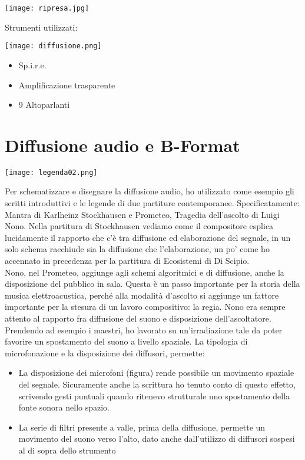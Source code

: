 \begin{center}
\texttt{[image: ripresa.jpg]}
\end{center}

Strumenti utilizzati:
\\
\begin{center}
\texttt{[image: diffusione.png]}
\end{center}
\begin{itemize}
	\item{Sp.i.r.e.}
	\item{Amplificazione trasparente}
	\item{9 Altoparlanti}
\end{itemize}


\section{Diffusione audio e B-Format}
\begin{center}
\texttt{[image: legenda02.png]}
\end{center}


Per schematizzare e disegnare la diffusione audio, ho utilizzato come esempio gli scritti introduttivi e le legende di due partiture contemporanee. Specificatamente: Mantra di Karlheinz Stockhausen e Prometeo, Tragedia dell'ascolto di Luigi Nono. Nella partitura di Stockhausen vediamo come il compositore esplica lucidamente il rapporto che c'è tra diffusione ed elaborazione del segnale, in un solo schema racchiude sia la diffusione che l'elaborazione, un po' come ho accennato in precedenza per la partitura di Ecosistemi di Di Scipio. \\
Nono, nel Prometeo, aggiunge agli schemi algoritmici e di diffusione, anche la disposizione del pubblico in sala. Questa è un passo importante per la storia della musica elettroacustica, perché alla modalità d'ascolto si aggiunge un fattore importante per la stesura di un lavoro compositivo: la regia. Nono era sempre attento al rapporto fra diffusione del suono e disposizione dell'ascoltatore. \\
Prendendo ad esempio i maestri, ho lavorato su un'irradiazione tale da poter favorire un spostamento del suono a livello spaziale. La tipologia di microfonazione e la disposizione dei diffusori, permette:
\begin{itemize}
\item{La disposizione dei microfoni (figura) rende possibile un movimento spaziale del segnale. Sicuramente anche la scrittura ho tenuto conto di questo effetto, scrivendo gesti puntuali quando ritenevo strutturale uno spostamento della fonte sonora nello spazio.}
\item{La serie di filtri presente a valle, prima della diffusione, permette un movimento del suono verso l'alto, dato anche dall'utilizzo di diffusori sospesi al di sopra dello strumento}
\end{itemize}

